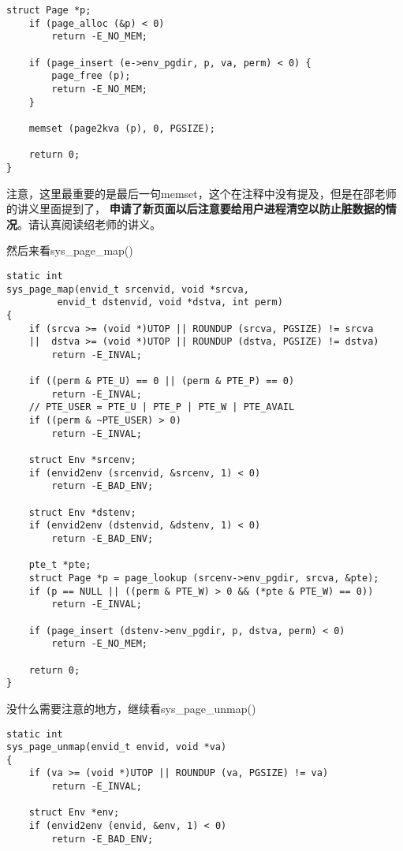\documentclass{article}
\newcommand{\highlight}[1]{{\bfseries \color{red}  #1}}
\newcommand{\funcname}[1]{{\ttfamily \small #1}}
\begin{document}
\begin{CJK*}{UTF8}{gkai}
\begin{lstlisting}[style=ccode, title={\scriptsize \ttfamily \bfseries kern/syscall.c: sys\_page\_alloc()}]
    struct Page *p;
    if (page_alloc (&p) < 0)
        return -E_NO_MEM;

    if (page_insert (e->env_pgdir, p, va, perm) < 0) {
        page_free (p);
        return -E_NO_MEM;
    }

    memset (page2kva (p), 0, PGSIZE);

    return 0;
}
\end{lstlisting}

注意，这里最重要的是最后一句memset，这个在注释中没有提及，但是在邵老师的讲义里面提到了，\highlight{申请了新页面以后注意要给用户进程清空以防止脏数据的情况}。请认真阅读绍老师的讲义。

然后来看\funcname{sys\_page\_map()}

\begin{lstlisting}[style=ccode, title={\scriptsize \ttfamily \bfseries kern/syscall.c: sys\_page\_map()}]
static int
sys_page_map(envid_t srcenvid, void *srcva,
	     envid_t dstenvid, void *dstva, int perm)
{
    if (srcva >= (void *)UTOP || ROUNDUP (srcva, PGSIZE) != srcva
    ||  dstva >= (void *)UTOP || ROUNDUP (dstva, PGSIZE) != dstva)
        return -E_INVAL;

    if ((perm & PTE_U) == 0 || (perm & PTE_P) == 0)
        return -E_INVAL;
    // PTE_USER = PTE_U | PTE_P | PTE_W | PTE_AVAIL
    if ((perm & ~PTE_USER) > 0)
        return -E_INVAL;

    struct Env *srcenv;
    if (envid2env (srcenvid, &srcenv, 1) < 0)
        return -E_BAD_ENV;

    struct Env *dstenv;
    if (envid2env (dstenvid, &dstenv, 1) < 0)
        return -E_BAD_ENV;

    pte_t *pte;
    struct Page *p = page_lookup (srcenv->env_pgdir, srcva, &pte);
    if (p == NULL || ((perm & PTE_W) > 0 && (*pte & PTE_W) == 0))
        return -E_INVAL;

    if (page_insert (dstenv->env_pgdir, p, dstva, perm) < 0)
        return -E_NO_MEM;

    return 0;
}
\end{lstlisting}

没什么需要注意的地方，继续看\funcname{sys\_page\_unmap()}


\begin{lstlisting}[style=ccode, title={\scriptsize \ttfamily \bfseries kern/syscall.c: sys\_page\_unmap()}]
static int
sys_page_unmap(envid_t envid, void *va)
{
    if (va >= (void *)UTOP || ROUNDUP (va, PGSIZE) != va)
        return -E_INVAL;

    struct Env *env;
    if (envid2env (envid, &env, 1) < 0)
        return -E_BAD_ENV;


\end{lstlisting}
\end{CJK*}
\end{document}

